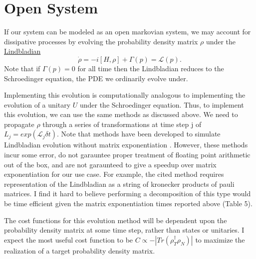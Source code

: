 \documentclass[letterpaper, 12pt]{article}
\begin{document}
\section{Open System}
If our system can be modeled as an open markovian system, we may account for dissipative processes by evolving the probability density matrix $\rho$ under the \href{https://en.wikipedia.org/wiki/Lindbladian}{Lindbladian}
\[
\dot{\rho} = -i[H, \rho] + \Gamma(p) = \mathcal{L}(p)\textrm{.}
\]
Note that if $\Gamma(p) = 0$ for all time then the Lindbladian reduces to the Schroedinger equation, the PDE we ordinarily evolve under.

Implementing this evolution is computationally analogous to implementing the evolution of a unitary $U$ under the Schroedinger equation. Thus, to implement this evolution, we can use the same methods as discussed above. We need to propagate $\rho$ through a series of transformations at time step j of $L_{j} = exp(\mathcal{L}_{j}\delta t)$. Note that methods have been developed to simulate Lindbladian evolution without matrix exponentiation \cite{cleve2016efficient}. However, these methods incur some error, do not garauntee proper treatment of floating point arithmetic out of the box, and are not garaunteed to give a speedup over matrix exponentiation for our use case. For example, the cited method requires representation of the Lindbladian as a string of kronecker products of pauli matrices. I find it hard to believe performing a decomposition of this type would be time efficient given the matrix exponentiation times reported above (Table 5).

The cost functions for this evolution method will be dependent upon the probability density matrix at some time step, rather than states or unitaries. I expect the most useful cost function to be $C \propto -|Tr(\rho^{\dagger}_{T} \rho_{N})|$ to maximize the realization of a target probability density matrix.
\end{document}
